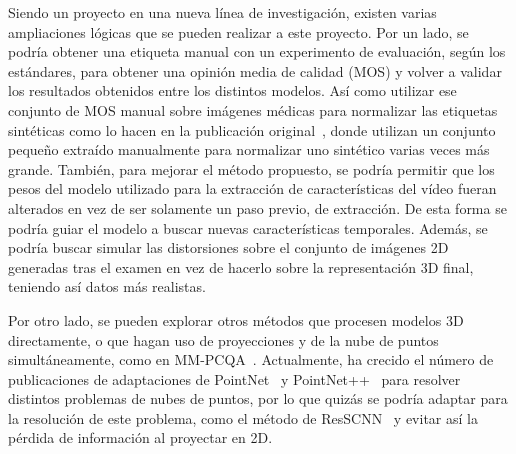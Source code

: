 Siendo un proyecto en una nueva línea de investigación, existen varias ampliaciones 
lógicas que se pueden realizar a este proyecto. Por un lado, se podría 
obtener una etiqueta manual con un experimento de evaluación, según los estándares, para 
obtener una opinión media de calidad (MOS) y volver a validar los resultados obtenidos
entre los distintos modelos. Así como utilizar ese conjunto de MOS manual sobre imágenes médicas 
para normalizar las etiquetas sintéticas como lo hacen en la publicación original~\cite{ResSCNN}, 
donde utilizan un conjunto pequeño extraído manualmente para normalizar uno sintético varias 
veces más grande. También, para mejorar el método propuesto, se podría permitir 
que los pesos del modelo utilizado para la extracción de características 
del vídeo fueran alterados en vez de ser solamente un paso previo, de extracción. 
De esta forma se podría guiar el modelo a buscar nuevas características temporales.  
Además, se podría buscar simular las distorsiones 
sobre el conjunto de imágenes 2D generadas tras el examen en vez de hacerlo 
sobre la representación 3D final, teniendo así datos más realistas. 

Por otro lado, se pueden explorar otros métodos que procesen modelos 3D directamente, 
o que hagan uso de proyecciones y de la nube de puntos simultáneamente, como en MM-PCQA~\cite{MM-PCQA}.
Actualmente, ha crecido el número de publicaciones de adaptaciones de PointNet~\cite{PointNet} y 
PointNet++~\cite{PointNet++} para resolver distintos problemas de nubes de puntos, 
por lo que quizás se podría adaptar para la resolución de este problema, como 
el método de ResSCNN~\cite{ResSCNN} y evitar así 
la pérdida de información al proyectar en 2D.

